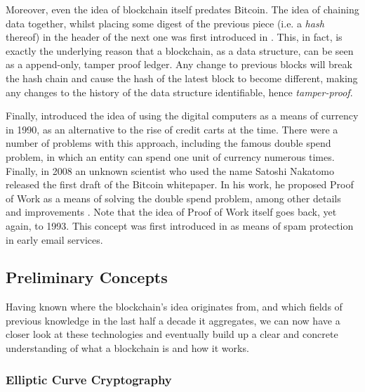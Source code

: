 Moreover, even the idea of blockchain itself predates Bitcoin. The idea of chaining data together,
whilst placing some digest of the previous piece (i.e. a \textit{hash} thereof) in the header of the
next one was first introduced in \cite{Timestamping_1991}. This, in fact, is exactly the underlying
reason that a blockchain, as a data structure, can be seen as a append-only, tamper proof ledger.
Any change to previous blocks will break the hash chain and cause the hash of the latest block to
become different, making any changes to the history of the data structure identifiable, hence
\textit{tamper-proof}.

Finally, \cite{Chaum_Fiat_Naor_1990} introduced the idea of using the digital computers as a means
of currency in 1990, as an alternative to the rise of credit carts at the time. There were a number
of problems with this approach, including the famous double spend problem, in which an entity can
spend one unit of currency numerous times. Finally, in 2008 an unknown scientist who used the name
Satoshi Nakatomo released the first draft of the Bitcoin whitepaper. In his work, he proposed Proof
of Work as a means of solving the double spend problem, among other details and improvements
\cite{Nakamoto}. Note that the idea of Proof of Work itself goes back, yet again, to 1993. This
concept was first introduced in \cite{pow_Dwork_Naor_1993} as means of spam protection in early
email services.


\subsection{Preliminary Concepts} \label{chap_bg:sec:preliminary}

Having known where the blockchain's idea originates from, and which fields of previous knowledge in
the last half a decade it aggregates, we can now have a closer look at these technologies and
eventually build up a clear and concrete understanding of what a blockchain is and how it works.

\subsubsection{Elliptic Curve Cryptography} \label{chap_bg:subsec:ecc}


